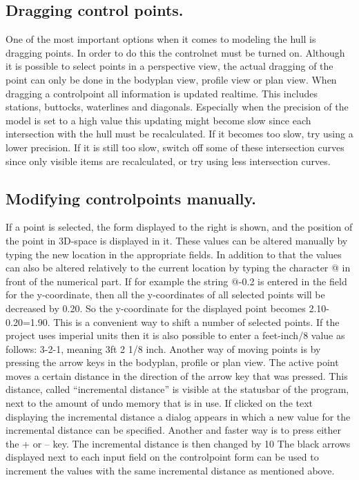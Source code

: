 \documentclass[12pt]{article}
\begin{document}
\subsection{Dragging control points.}
One of the most important options when it comes to modeling the hull is dragging points. In order to
do this the controlnet must be turned on. Although it is possible to select points in a perspective
view, the actual dragging of the point can only be done in the bodyplan view, profile view or plan
view. When dragging a controlpoint all information is updated realtime. This includes stations,
buttocks, waterlines and diagonals. Especially when the precision of the model is set to a high value
this updating might become slow since each intersection with the hull must be recalculated. If it
becomes too slow, try using a lower precision. If it is still too slow, switch off some of these
intersection curves since only visible items are recalculated, or try using less intersection curves.

\subsection{Modifying controlpoints manually.}
If a point is selected, the form displayed to the right is shown, and the
position of the point in 3D-space is displayed in it. These values can be
altered manually by typing the new location in the appropriate fields. In
addition to that the values can also be altered relatively to the current
location by typing the character @ in front of the numerical part. If for
example the string @-0.2 is entered in the field for the y-coordinate, then all the y-coordinates of all
selected points will be decreased by 0.20. So the y-coordinate for the displayed point becomes
2.10-0.20=1.90. This is a convenient way to shift a number of selected points. If the project uses
imperial units then it is also possible to enter a feet-inch/8 value as follows: 3-2-1, meaning 3ft 2 1/8
inch.
Another way of moving points is by pressing the arrow keys in the bodyplan, profile or plan view.
The active point moves a certain distance in the direction of the arrow key that was pressed. This
distance, called “incremental distance” is visible at the statusbar of the program, next to the amount
of undo memory that is in use. If clicked on the text displaying the incremental distance a dialog
appears in which a new value for the incremental distance can be specified. Another and faster way
is to press either the + or – key. The incremental distance is then changed by 10%
The black arrows displayed next to each input field on the controlpoint form can be used to
increment the values with the same incremental distance as mentioned above.
\end{document}
